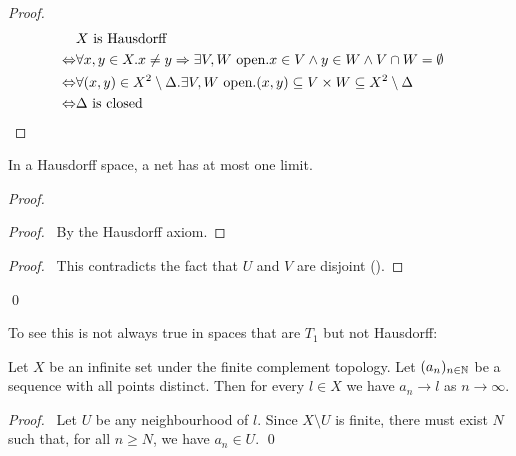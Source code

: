 \begin{proof}
    \pf
    \begin{align*}
        & X \text{ is Hausdorff} \\
        \Leftrightarrow & \forall x,y \in X. x \neq y \Rightarrow \exists V, W \text{ open}. x \in V \wedge y \in W \wedge V \cap W = \emptyset \\
        \Leftrightarrow & \forall (x,y) \in X^2 \setminus \Delta. \exists V,W \text{ open}. (x,y) \subseteq V \times W \subseteq X^2 \setminus \Delta \\
        \Leftrightarrow & \Delta \text{ is closed} & \qed
    \end{align*}
\end{proof}

\begin{theorem}
    In a Hausdorff space, a net has at most one limit.
\end{theorem}

\begin{proof}
    \pf
    \begin{proof}
        \pf\ By the Hausdorff axiom.
    \end{proof}
    \qedstep
    \begin{proof}
        \pf\ This contradicts the fact that $U$ and $V$ are disjoint ().
    \end{proof}
    \qed
\end{proof}

To see this is not always true in spaces that are $T_1$ but not Hausdorff:

\begin{proposition}
    Let $X$ be an infinite set under the finite complement topology. Let $(a_n)_{n \in \NN}$ be a sequence
    with all points distinct. Then for every $l \in X$ we have $a_n \rightarrow l$ as
    $n \rightarrow \infty$.
\end{proposition}

\begin{proof}
    \pf\ Let $U$ be any neighbourhood of $l$. Since $X \setminus U$ is finite, there must exist $N$
    such that, for all $n \geq N$, we have $a_n \in U$. \qed
\end{proof}

